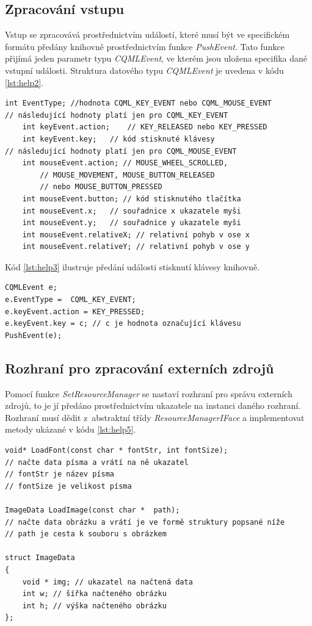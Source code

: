 \documentclass[11pt,twoside,a4paper]{book}
\begin{document}
\subsection{Zpracování vstupu}
Vstup se zpracovává prostřednictvím událostí, které musí být ve specifickém formátu předány knihovně prostřednictvím funkce \textit{PushEvent}. Tato funkce přijímá jeden parametr typu \textit{CQMLEvent}, ve kterém jsou uložena specifika dané vstupní události. Struktura datového typu \textit{CQMLEvent} je uvedena v kódu \ref{lst:help2}.
\begin{lstlisting}[frame=single,caption=Struktura datového typu \textit{CQMLEvent}.,label=lst:help2]
int EventType; //hodnota CQML_KEY_EVENT nebo CQML_MOUSE_EVENT
// následující hodnoty platí jen pro CQML_KEY_EVENT
	int keyEvent.action;	// KEY_RELEASED nebo KEY_PRESSED
	int keyEvent.key;	// kód stisknuté klávesy
// následující hodnoty platí jen pro CQML_MOUSE_EVENT
	int mouseEvent.action; // MOUSE_WHEEL_SCROLLED, 
		// MOUSE_MOVEMENT, MOUSE_BUTTON_RELEASED 
		// nebo MOUSE_BUTTON_PRESSED
	int mouseEvent.button; // kód stisknutého tlačítka
	int mouseEvent.x;	// souřadnice x ukazatele myši
	int mouseEvent.y;	// souřadnice y ukazatele myši
	int mouseEvent.relativeX; // relativní pohyb v ose x
	int mouseEvent.relativeY; // relativní pohyb v ose y
\end{lstlisting}
Kód \ref{lst:help3} ilustruje předání události stisknutí klávesy knihovně.
\begin{lstlisting}[float,frame=single,caption=Předání vstupu z klávesnice knihovně.,label=lst:help3]
CQMLEvent e;
e.EventType =  CQML_KEY_EVENT;
e.keyEvent.action = KEY_PRESSED;
e.keyEvent.key = c; // c je hodnota označující klávesu
PushEvent(e);
\end{lstlisting}

\subsection{\label{SEC:resI}Rozhraní pro zpracování externích zdrojů}
Pomocí funkce \textit{SetResourceManager} se nastaví rozhraní pro správu externích zdrojů, to je jí předáno prostřednictvím ukazatele na instanci daného rozhraní. Rozhraní musí dědit z~abstraktní třídy \textit{ResourceManagerIFace} a implementovat metody ukázané v kódu \ref{lst:help5}.
\begin{lstlisting}[frame=single,caption=Metody rozhraní pro správu externích zdrojů.,label=lst:help5]
void* LoadFont(const char * fontStr, int fontSize);
// načte data písma a vrátí na ně ukazatel
// fontStr je název písma
// fontSize je velikost písma

ImageData LoadImage(const char *  path);
// načte data obrázku a vrátí je ve formě struktury popsané níže
// path je cesta k souboru s obrázkem

struct ImageData
{
	void * img; // ukazatel na načtená data
	int w; // šířka načteného obrázku
	int h; // výška načteného obrázku
};
\end{lstlisting}
\end{document}
